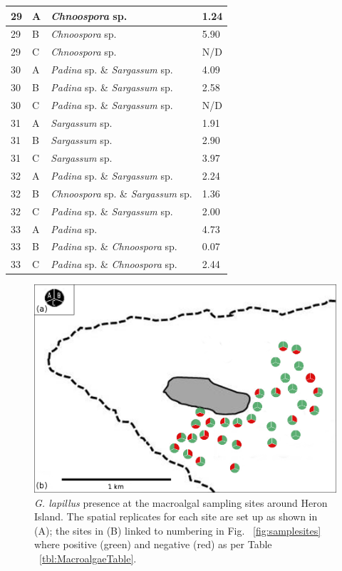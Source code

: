 \documentclass[12pt]{article}
\begin{document}
\begin{longtable}{ | p{2cm} | p{2cm} | p{3cm} | p{3.5cm} |}
\hline
29&A&\emph{Chnoospora }sp.&1.24
\\
\hline
29&B&\emph{Chnoospora }sp.&5.90
\\
\hline
29&C&\emph{Chnoospora} sp.&N/D\\
\hline
30&A&\emph{Padina} sp. \& \emph{Sargassum} sp.&4.09
\\
\hline
30&B&\emph{Padina} sp. \& \emph{Sargassum} sp.&2.58
\\
\hline
30&C&\emph{Padina} sp. \& \emph{Sargassum} sp.&N/D\\
\hline
31&A&\emph{Sargassum} sp.&1.91
\\
\hline
31&B&\emph{Sargassum} sp.&2.90
\\
\hline
31&C&\emph{Sargassum} sp.&3.97
\\
\hline
32&A&\emph{Padina} sp. \& \emph{Sargassum} sp.&2.24
\\
\hline
32&B&\emph{Chnoospora }sp. \& \emph{Sargassum} sp.&1.36
\\
\hline
32&C&\emph{Padina} sp. \& \emph{Sargassum} sp.&2.00
\\
\hline
33&A&\emph{Padina} sp.&4.73
\\
\hline
33&B&\emph{Padina} sp. \& \emph{Chnoospora} sp.&0.07
\\
\hline
33&C&\emph{Padina} sp. \& \emph{Chnoospora} sp.&2.44
\\
\hline
\end{longtable}

\begin{figure} 
\includegraphics[scale=2.5]{Hero_qpcr-figs/Fig4_Heron-positive-negative-samplingsites_Nov18.png} 
\caption{\emph{G. lapillus} presence at the macroalgal sampling sites around Heron Island. The spatial replicates for each site are set up as shown in (A); the sites in (B) linked to numbering in Fig. ~\ref{fig:samplesites} where positive (green) and negative (red) as per Table ~\ref{tbl:MacroalgaeTable}.} 
\label{fig:envposneg}
\end{figure} 
 
\end{document}
